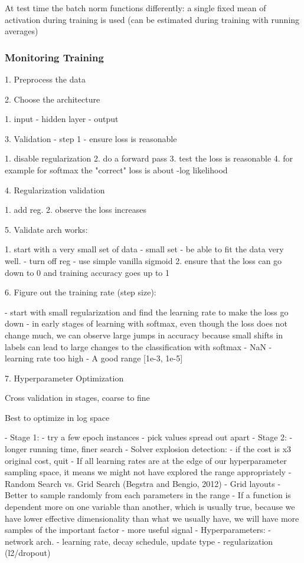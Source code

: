 At test time the batch norm functions differently: a single fixed mean of activation during training is used (can be estimated during training with running averages)

\subsubsection{Monitoring Training }

1. Preprocess the data

2. Choose the architecture

   1. input - hidden layer - output

3. Validation - step 1 - ensure loss is reasonable 

   1. disable regularization
   2. do a forward pass
   3. test the loss is reasonable
   4. for example for softmax the "correct" loss is about -log likelihood

4. Regularization validation

   1. add reg. 
   2. observe the loss increases

5. Validate arch works:

   1. start with a very small set of data
      - small set - be able to fit the data very well.
      - turn off reg
      - use simple vanilla sigmoid
   2. ensure that the loss can go down to 0 and training accuracy goes up to 1

6. Figure out the training rate (step size):

   - start with small regularization and find the learning rate to make the loss go down
   - in early stages of learning with softmax, even though the loss does not change much, we can observe large jumps in accuracy because small shifts in labels can lead to large changes to the classification with softmax
   - NaN - learning rate too high
   - A good range [1e-3, 1e-5]

7. Hyperparameter Optimization

   Cross validation in stages, coarse to fine

   Best to optimize in log space

   - Stage 1:
     - try a few epoch instances
     - pick values spread out apart
   - Stage 2:
     - longer running time, finer search
   - Solver explosion detection: 
     - if the cost is x3 original cost, quit
   - If all learning rates are at the edge of our hyperparameter sampling space, it means we might not have explored the range appropriately
   - Random Search vs. Grid Search (Begstra and Bengio, 2012)
     - Grid layouts 
     - Better to sample randomly from each parameters in the range
     - If a function is dependent more on one variable than another, which is usually true, because we have lower effective dimensionality than what we usually have, we will have more samples of the important factor - more useful signal
   - Hyperparameters:
     - network arch.
     - learning rate, decay schedule, update type
     - regularization (l2/dropout)

